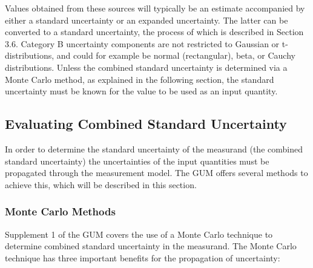 \documentclass[../thesis/thesis.tex]{subfiles}
\begin{document}
\begin{refsection}
Values obtained from these sources will typically be an estimate accompanied by either a standard uncertainty or an expanded uncertainty. The latter can be converted to a standard uncertainty, the process of which is described in Section 3.6. Category B uncertainty components are not restricted to Gaussian or t-distributions, and could for example be normal (rectangular), beta, or Cauchy distributions. Unless the combined standard uncertainty is determined via a Monte Carlo method, as explained in the following section, the standard uncertainty must be known for the value to be used as an input quantity.

\subsection{Evaluating Combined Standard Uncertainty}

In order to determine the standard uncertainty of the measurand (the combined standard uncertainty) the uncertainties of the input quantities must be propagated through the measurement model. The GUM offers several methods to achieve this, which will be described in this section.

\subsubsection{Monte Carlo Methods}

Supplement 1 of the GUM \cite{GUM_S1} covers the use of a Monte Carlo technique to determine combined standard uncertainty in the measurand. The Monte Carlo technique has three important benefits for the propagation of uncertainty:


\end{refsection}
\end{document}
